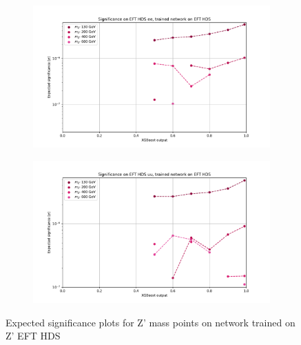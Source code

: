 \documentclass[12pt, a4paper]{book}
\begin{document}
\begin{figure}[!ht]
	\centering
	\begin{subfigure}[b]{0.49\textwidth}
      \centering
      \includegraphics[width=1\textwidth]{XGBoost/EFT_HDS/EXP_SIG_ee.pdf}
      \end{subfigure}
   \hfill
   \begin{subfigure}[b]{0.49\textwidth}
      \centering
      \includegraphics[width=1\textwidth]{XGBoost/EFT_HDS/EXP_SIG_uu.pdf}
      \end{subfigure}
   \caption{Expected significance plots for Z' mass points on network trained on Z' EFT HDS}\label{fig:EFT_HDS_exp_sig}
\end{figure}
\end{document}
